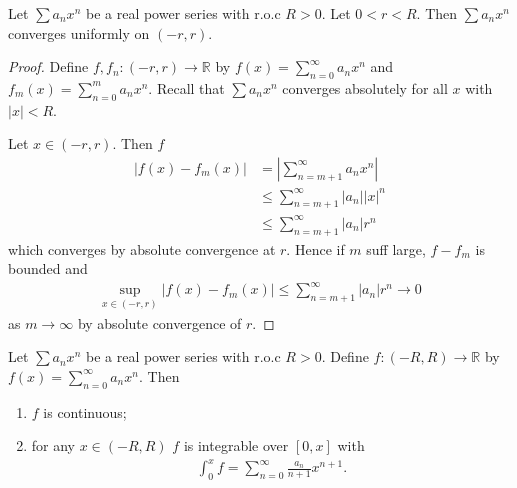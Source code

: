 \begin{lemma} \label{lem:8}
    Let $\sum a_n x^n$ be a real power series with r.o.c $R > 0$.
    Let $0 < r < R$.
    Then $\sum a_n x^n$ converges uniformly on $(-r, r)$.
\end{lemma} 

\begin{proof}
    Define $f, f_n : (-r, r) \to \mathbb{R}$ by $f(x) = \sum_{n=0}^{\infty} a_n x^n$ and $f_m(x) = \sum_{n=0}^{m} a_n x^n$.
    Recall that $\sum a_n x^n$ converges absolutely for all $x$ with $|x| < R$.

    Let $x \in (-r, r)$.
    Then $f$
    \begin{align*}
        |f(x) - f_m(x)| &= \left| \sum_{n=m+1}^{\infty} a_n x^n \right| \\
        &\leq \sum_{n=m+1}^{\infty} |a_n| |x|^n \\
        &\leq \sum_{n=m+1}^{\infty} |a_n| r^n
    \end{align*} which converges by absolute convergence at $r$.
    Hence if $m$ suff large, $f - f_m$ is bounded and 
    \begin{align*}
        \sup_{x \in (-r, r)} |f(x) - f_m(x)| \leq \sum_{n=m+1}^{\infty} |a_n| r^n \to 0
    \end{align*} as $m \to \infty$ by absolute convergence of $r$.
\end{proof} 

\begin{theorem} \label{thm:9}
    Let $\sum a_n x^n$ be a real power series with r.o.c $R > 0$.
    Define $f : (-R, R) \to \mathbb{R}$ by $f(x) = \sum_{n=0}^{\infty} a_n x^n$.
    Then 
    \begin{enumerate}
        \item $f$ is continuous;
        \item for any $x \in (-R, R)$ $f$ is integrable over $[0, x]$ with 
        \begin{align*}
            \int_0^x f = \sum_{n=0}^{\infty} \frac{a_n}{n + 1} x^{n + 1}.
        \end{align*} 
    \end{enumerate} 
\end{theorem} 

